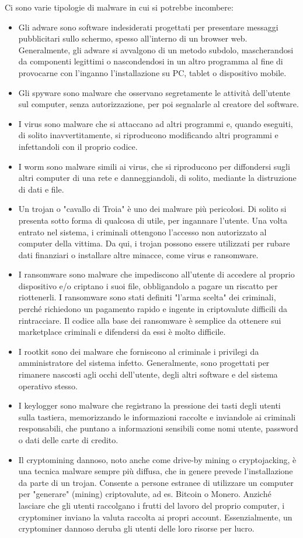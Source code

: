 Ci sono varie tipologie di malware in cui si potrebbe incombere: 
\begin{itemize}
    \item Gli adware sono software indesiderati progettati per presentare messaggi pubblicitari sullo schermo, spesso all'interno di un browser web. Generalmente, gli adware si avvalgono di un metodo subdolo, mascherandosi da componenti legittimi o nascondendosi in un altro programma al fine di provocarne con l'inganno l'installazione su PC, tablet o dispositivo mobile.
    \item Gli spyware sono malware che osservano segretamente le attività dell'utente sul computer, senza autorizzazione, per poi segnalarle al creatore del software.
    \item I virus sono malware che si attaccano ad altri programmi e, quando eseguiti, di solito inavvertitamente, si riproducono modificando altri programmi e infettandoli con il proprio codice.
    \item I worm sono malware simili ai virus, che si riproducono per diffondersi sugli altri computer di una rete e danneggiandoli, di solito, mediante la distruzione di dati e file.
    \item Un trojan o "cavallo di Troia" è uno dei malware più pericolosi. Di solito si presenta sotto forma di qualcosa di utile, per ingannare l'utente. Una volta entrato nel sistema, i criminali ottengono l'accesso non autorizzato al computer della vittima. Da qui, i trojan possono essere utilizzati per rubare dati finanziari o installare altre minacce, come virus e ransomware.
    \item I ransomware sono malware che impediscono all'utente di accedere al proprio dispositivo e/o criptano i suoi file, obbligandolo a pagare un riscatto per riottenerli. I ransomware sono stati definiti "l'arma scelta" dei criminali, perché richiedono un pagamento rapido e ingente in criptovalute difficili da rintracciare. Il codice alla base dei ransomware è semplice da ottenere sui marketplace criminali e difendersi da essi è molto difficile.
    \item I rootkit sono dei malware che forniscono al criminale i privilegi da amministratore del sistema infetto. Generalmente, sono progettati per rimanere nascosti agli occhi dell'utente, degli altri software e del sistema operativo stesso.
    \item I keylogger sono malware che registrano la pressione dei tasti degli utenti sulla tastiera, memorizzando le informazioni raccolte e inviandole ai criminali responsabili, che puntano a informazioni sensibili come nomi utente, password o dati delle carte di credito.
    \item Il cryptomining dannoso, noto anche come drive-by mining o cryptojacking, è una tecnica malware sempre più diffusa, che in genere prevede l'installazione da parte di un trojan. Consente a persone estranee di utilizzare un computer per "generare" (mining) criptovalute, ad es. Bitcoin o Monero. Anziché lasciare che gli utenti raccolgano i frutti del lavoro del proprio computer, i cryptominer inviano la valuta raccolta ai propri account. Essenzialmente, un cryptominer dannoso deruba gli utenti delle loro risorse per lucro.
\end{itemize}

